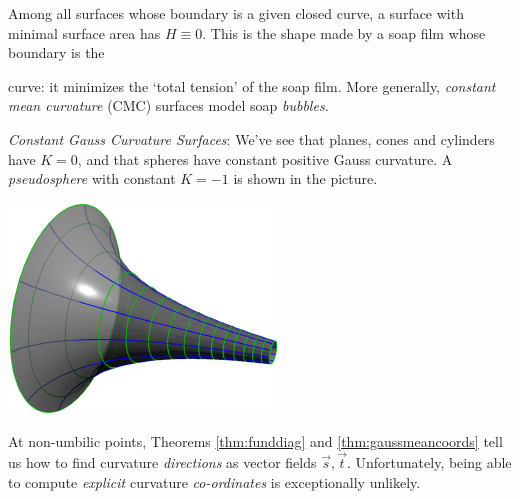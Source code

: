 \begin{description}
	\item[\normalfont\emph{Minimal Surfaces} $H\equiv 0$:] Among all surfaces whose boundary is a given closed curve, a surface with minimal surface area has $H\equiv 0$. This is the shape made by a soap film whose boundary is the \phantom{curve}\par
	
	\begin{minipage}[t]{0.69\linewidth}\vspace{-25pt}
		 curve: it minimizes the `total tension' of the soap film. More generally, \emph{constant mean curvature} (CMC) surfaces model soap \emph{bubbles.}
		 
		\item[\normalfont\emph{Constant Gauss Curvature Surfaces}:] We've see that planes, cones and cylinders have $K=0$, and that spheres have constant positive Gauss curvature. A \emph{pseudosphere} with constant $K=-1$ is shown in the picture.
	\end{minipage}
	\hfill
	\begin{minipage}[t]{0.3\linewidth}\vspace{-23pt}
		\flushright\href{http://www.math.uci.edu/~ndonalds/math162a/curv-pseudosphere.html}{\includegraphics[scale=0.95]{curv-pseudosphere}}\vspace{-15pt}
	\end{minipage}
\end{description}


\goodbreak



At non-umbilic points, Theorems \ref{thm:funddiag} and \ref{thm:gaussmeancoords} tell us how to find curvature \emph{directions} as vector fields $\vec s,\vec t$. Unfortunately, being able to compute \emph{explicit} curvature \emph{co-ordinates} is exceptionally unlikely.

